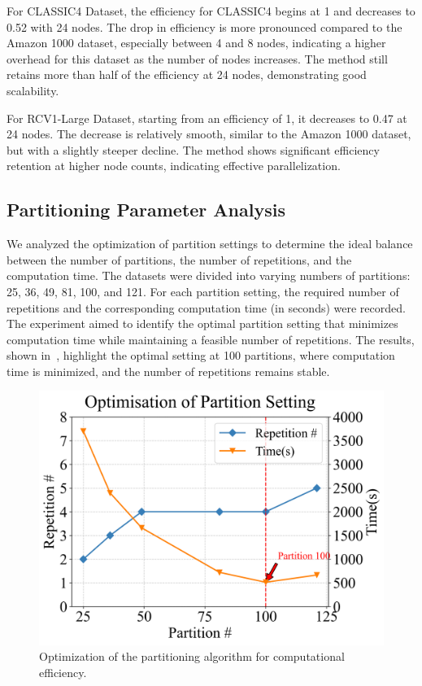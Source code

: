\documentclass[journal]{IEEEtran}
\begin{document}
For CLASSIC4 Dataset, the efficiency for CLASSIC4 begins at 1 and decreases to 0.52 with 24 nodes. The drop in efficiency is more pronounced compared to the Amazon 1000 dataset, especially between 4 and 8 nodes, indicating a higher overhead for this dataset as the number of nodes increases. The method still retains more than half of the efficiency at 24 nodes, demonstrating good scalability.

For RCV1-Large Dataset, starting from an efficiency of 1, it decreases to 0.47 at 24 nodes. The decrease is relatively smooth, similar to the Amazon 1000 dataset, but with a slightly steeper decline. The method shows significant efficiency retention at higher node counts, indicating effective parallelization.

\subsection{Partitioning Parameter Analysis}
We analyzed the optimization of partition settings to determine the ideal balance between the number of partitions, the number of repetitions, and the computation time. The datasets were divided into varying numbers of partitions: 25, 36, 49, 81, 100, and 121. For each partition setting, the required number of repetitions and the corresponding computation time (in seconds) were recorded. The experiment aimed to identify the optimal partition setting that minimizes computation time while maintaining a feasible number of repetitions. The results, shown in~, highlight the optimal setting at 100 partitions, where computation time is minimized, and the number of repetitions remains stable.

\begin{figure}[htbp]
    \centering
    \includegraphics[width=0.8\linewidth]{optimisation.png}
    \caption{Optimization of the partitioning algorithm for computational efficiency.}
    \label{fig:optimisation}
\end{figure}
\end{document}
